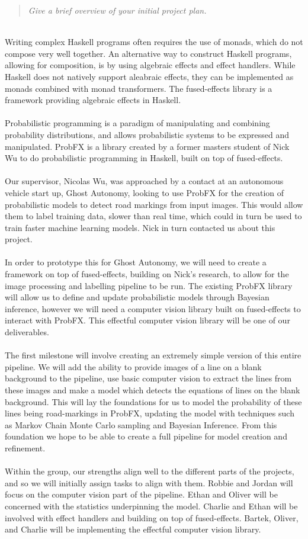 \documentclass{report}
\newcommand{\teamq}[1]{\begin{quote}
    \large\textit{#1}
\end{quote}}
\begin{document}
\teamq{Give a brief overview of your initial project plan.}
\\
Writing complex Haskell programs often requires the use of monads, which do not compose very well together. An alternative way to construct Haskell programs, allowing for composition, is by using algebraic effects and effect handlers. While Haskell does not natively support aleabraic effects, they can be implemented as monads combined with monad transformers. The fused-effects library is a framework providing algebraic effects in Haskell.
\\
\\Probabilistic programming is a paradigm of manipulating and combining probability distributions, and allows probabilistic systems to be expressed and manipulated. ProbFX is a library created by a former masters student of Nick Wu to do probabilistic programming in Haskell, built on top of fused-effects.
\\
\\Our supervisor, Nicolas Wu, was approached by a contact at an autonomous vehicle start up, Ghost Autonomy, looking to use ProbFX for the creation of probabilistic models to detect road markings from input images. This would allow them to label training data, slower than real time, which could in turn be used to train faster machine learning models. Nick in turn contacted us about this project.
\\
\\In order to prototype this for Ghost Autonomy, we will need to create a framework on top of fused-effects, building on Nick's research, to allow for the image processing and labelling pipeline to be run. The existing ProbFX library will allow us to define and update probabilistic models through Bayesian inference, however we will need a computer vision library built on fused-effects to interact with ProbFX. This effectful computer vision library will be one of our deliverables.
\\
\\ The first milestone will involve creating an extremely simple version of this entire pipeline. We will add the ability to provide images of a line on a blank background to the pipeline, use basic computer vision to extract the lines from these images and make a model which detects the equations of lines on the blank background. This will lay the foundations for us to model the probability of these lines being road-markings in ProbFX, updating the model with techniques such as Markov Chain Monte Carlo sampling and Bayesian Inference. From this foundation we hope to be able to create a full pipeline for model creation and refinement.
\\
\\Within the group, our strengths align well to the different parts of the projects, and so we will initially assign tasks to align with them. Robbie and Jordan will focus on the computer vision part of the pipeline. Ethan and Oliver will be concerned with the statistics underpinning the model. Charlie and Ethan will be involved with effect handlers and building on top of fused-effects. Bartek, Oliver, and Charlie will be implementing the effectful computer vision library.
\end{document}
